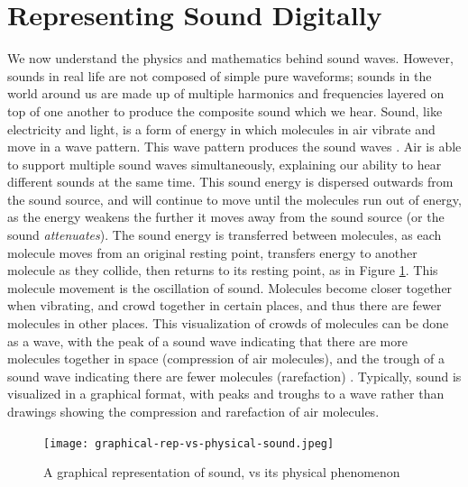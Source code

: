 \section{Representing Sound Digitally}

We now understand the physics and mathematics behind sound waves. However, sounds in real life are not composed of simple pure waveforms; sounds in the world around us are made up of multiple harmonics and frequencies layered on top of one another to produce the composite sound which we hear. Sound, like electricity and light, is a form of energy in which molecules in air vibrate and move in a wave pattern. This wave pattern produces the sound waves \cite{Au-Yeung_2021}. Air is able to support multiple sound waves simultaneously, explaining our ability to hear different sounds at the same time. This sound energy is dispersed outwards from the sound source, and will continue to move until the molecules run out of energy, as the energy weakens the further it moves away from the sound source (or the sound \textit{attenuates}). The sound energy is transferred between molecules, as each molecule moves from an original resting point, transfers energy to another molecule as they collide, then returns to its resting point, as in Figure \ref{fig:graphical-rep-vs-physical-sound}. This molecule movement is the oscillation of sound. Molecules become closer together when vibrating, and crowd together in certain places, and thus there are fewer molecules in other places. This visualization of crowds of molecules can be done as a wave, with the peak of a sound wave indicating that there are more molecules together in space (compression of air molecules), and the trough of a sound wave indicating there are fewer molecules (rarefaction) \cite{Toft_2020}. Typically, sound is visualized in a graphical format, with peaks and troughs to a wave rather than drawings showing the compression and rarefaction of air molecules. 

\begin{figure}
  \centering
  \texttt{[image: graphical-rep-vs-physical-sound.jpeg]}
  \caption{A graphical representation of sound, vs its physical phenomenon}\cite{Toft_2020}
  \label{fig:graphical-rep-vs-physical-sound}
\end{figure}

